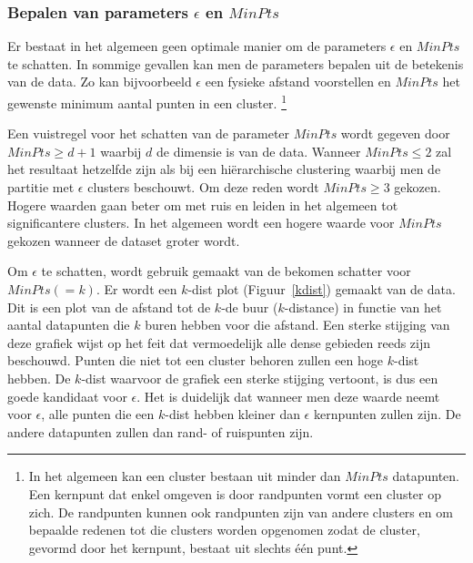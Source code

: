 \documentclass[a4paper,12pt]{article}
\theoremstyle{definition}
\begin{document}
\subsubsection{Bepalen van parameters $\epsilon$ en $MinPts$}
Er bestaat in het algemeen geen optimale manier om de parameters $\epsilon$ en $MinPts$
te schatten. In sommige gevallen kan men de parameters bepalen uit de betekenis
van de data. Zo kan bijvoorbeeld $\epsilon$ een fysieke afstand voorstellen en $MinPts$
het gewenste minimum aantal punten in een cluster. \footnote{In het algemeen kan
een cluster bestaan uit minder dan $MinPts$ datapunten. Een kernpunt dat enkel
omgeven is door randpunten vormt een cluster op zich. De randpunten kunnen ook
randpunten zijn van andere clusters en om bepaalde redenen tot die clusters worden
opgenomen zodat de cluster, gevormd door het kernpunt, bestaat uit slechts één punt.}

Een vuistregel voor het schatten van de parameter $MinPts$ wordt gegeven door
$MinPts \geq d+1$ waarbij $d$ de dimensie is van de data. Wanneer $MinPts \leq 2$
zal het resultaat hetzelfde zijn als bij een hiërarchische clustering waarbij men
de partitie met $\epsilon$ clusters beschouwt. Om deze reden wordt $MinPts \geq 3$
gekozen. Hogere waarden gaan beter om met ruis en leiden in het algemeen tot
significantere clusters. In het algemeen wordt een hogere waarde voor
$MinPts$ gekozen wanneer de dataset groter wordt.

Om $\epsilon$ te schatten, wordt gebruik gemaakt van de bekomen schatter voor
$MinPts (=k)$. Er wordt een $k$-dist plot (Figuur~\ref{kdist}) gemaakt van de data.
Dit is een plot van de afstand tot de $k$-de buur ($k$-distance) in functie van
het aantal datapunten die $k$ buren hebben voor die afstand. Een sterke stijging
van deze grafiek wijst op het feit dat vermoedelijk alle dense gebieden reeds zijn
beschouwd. Punten die niet tot een cluster behoren zullen een hoge $k$-dist hebben.
De $k$-dist waarvoor de grafiek een sterke stijging vertoont, is dus een goede
kandidaat voor $\epsilon$. Het is duidelijk dat wanneer men deze waarde neemt voor
$\epsilon$, alle punten die een $k$-dist hebben kleiner dan $\epsilon$ kernpunten
zullen zijn. De andere datapunten zullen dan rand- of ruispunten zijn.
\end{document}
